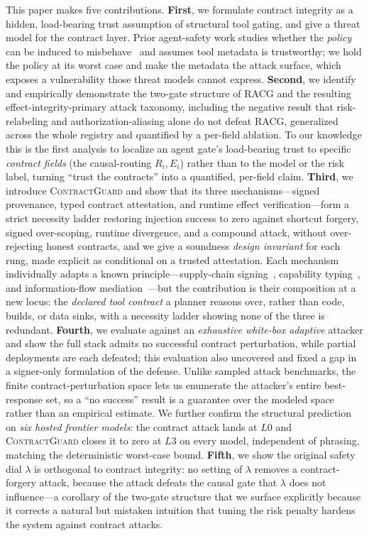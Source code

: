 \documentclass[conference,onecolumn]{IEEEtran}
\theoremstyle{definition}
\newcommand{\racg}{\textsc{RACG}}
\newcommand{\cg}{\textsc{ContractGuard}}
\begin{document}
This paper makes five contributions.
\textbf{First}, we formulate contract integrity as a hidden, load-bearing trust
assumption of structural tool gating, and give a threat model for the contract
layer. Prior agent-safety work studies whether the \emph{policy} can be induced
to misbehave~\cite{ruan2024toolemu,debenedetti2024agentdojo,zhan2024injecagent}
and assumes tool metadata is trustworthy; we hold the policy at its worst case
and make the metadata the attack surface, which exposes a vulnerability those
threat models cannot express.
\textbf{Second}, we identify and empirically demonstrate the two-gate structure
of \racg{} and the resulting effect-integrity-primary attack taxonomy, including
the negative result that risk-relabeling and authorization-aliasing alone do not
defeat \racg, generalized across the whole registry and quantified by a
per-field ablation. To our knowledge this is the first analysis to localize an
agent gate's load-bearing trust to specific \emph{contract fields} (the
causal-routing $R_i,E_i$) rather than to the model or the risk label, turning
``trust the contracts'' into a quantified, per-field claim.
\textbf{Third}, we introduce \cg{} and show that its three mechanisms---signed
provenance, typed contract attestation, and runtime effect
verification---form a strict necessity ladder restoring injection success to zero
against shortcut forgery, signed over-scoping, runtime divergence, and a compound
attack, without over-rejecting honest contracts, and we give a soundness
\emph{design invariant} for each rung, made explicit as conditional on a trusted
attestation. Each mechanism individually adapts a known
principle---supply-chain signing~\cite{torres2019intoto,slsa2023}, capability
typing~\cite{miller2006robust,mettler2010joee}, and information-flow
mediation~\cite{myers2000jflow}---but the contribution is their composition at a
new locus: the \emph{declared tool contract} a planner reasons over, rather than
code, builds, or data sinks, with a necessity ladder showing none of the three
is redundant.
\textbf{Fourth}, we evaluate against an \emph{exhaustive white-box adaptive}
attacker and show the full stack admits no successful contract perturbation,
while partial deployments are each defeated; this evaluation also uncovered and
fixed a gap in a signer-only formulation of the defense. Unlike sampled
attack benchmarks, the finite contract-perturbation space lets us enumerate the
attacker's entire best-response set, so a ``no success'' result is a guarantee
over the modeled space rather than an empirical estimate. We further confirm the
structural prediction on \emph{six hosted frontier models}: the contract attack
lands at $L0$ and \cg{} closes it to zero at $L3$ on every model, independent of
phrasing, matching the deterministic worst-case bound.
\textbf{Fifth}, we show the original safety dial $\lambda$ is orthogonal to
contract integrity: no setting of $\lambda$ removes a contract-forgery attack,
because the attack defeats the causal gate that $\lambda$ does not influence---a
corollary of the two-gate structure that we surface explicitly because it
corrects a natural but mistaken intuition that tuning the risk penalty hardens
the system against contract attacks.
\end{document}
